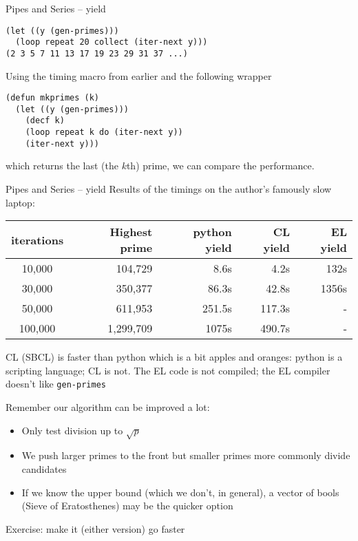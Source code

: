 \documentclass[presentation]{beamer}
\begin{document}
\begin{frame}[fragile]{Pipes and Series -- yield}
\begin{verbatim}
(let ((y (gen-primes)))
  (loop repeat 20 collect (iter-next y)))
(2 3 5 7 11 13 17 19 23 29 31 37 ...)
\end{verbatim}
Using the timing macro from earlier and the following wrapper
\begin{verbatim}
(defun mkprimes (k)
  (let ((y (gen-primes)))
    (decf k)
    (loop repeat k do (iter-next y))
    (iter-next y)))
\end{verbatim}
which returns the last (the $k$th) prime, we can compare the performance.
\end{frame}

\begin{frame}[fragile]{Pipes and Series -- yield}
Results of the timings on the author's famously slow laptop:
\begin{tabular}{|c|r|r|r|r|}
  \hline
  iterations & Highest prime & python yield & CL yield & EL yield \\
  \hline
  10,000 & 104,729 & 8.6s & 4.2s & 132s \\
  30,000 & 350,377 & 86.3s & 42.8s & 1356s \\
  50,000 & 611,953 & 251.5s & 117.3s & - \\
  100,000 & 1,299,709 & 1075s & 490.7s & - \\
  \hline
\end{tabular}

CL (SBCL) is faster than python which is a bit apples and oranges: python is a scripting language; CL is not.  The EL code is not compiled; the EL compiler doesn't like \texttt{gen-primes}

\medskip
Remember our algorithm can be improved a lot:
\begin{itemize}
\item Only test division up to $\sqrt{p}$
\item We push larger primes to the front but smaller primes more commonly divide candidates
\item If we know the upper bound (which we don't, in general), a vector of bools (Sieve of Eratosthenes) may be the quicker option
\end{itemize}
Exercise: make it (either version) go faster
\end{frame}
\end{document}
